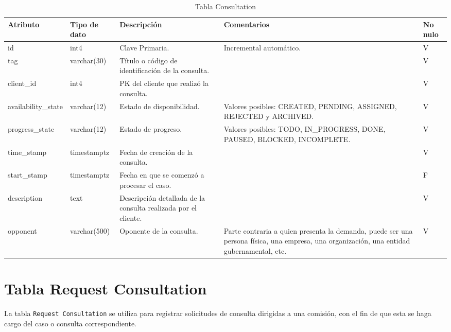 \begin{table}[H]
\centering
\label{tab:consultation}
\begin{tabular}{|p{3cm}|p{2.5cm}|p{4.5cm}|p{4cm}|p{1cm}|}
\hline
\textbf{Atributo} & \textbf{Tipo de dato}  & \textbf{Descripción} & \textbf{Comentarios} & \textbf{No nulo} \\ \hline
id & int4 & Clave Primaria. & Incremental automático. & V \\ \hline
tag & varchar(30) & Título o código de identificación de la consulta. & & V \\ \hline
client\_id & int4 & PK del cliente que realizó la consulta. & & V \\ \hline
availability\_state & varchar(12) & Estado de disponibilidad. & Valores posibles: CREATED, PENDING, ASSIGNED, REJECTED y ARCHIVED. & V \\ \hline
progress\_state & varchar(12)  & Estado de progreso. & Valores posibles: TODO, IN\_PROGRESS, DONE, PAUSED, BLOCKED, INCOMPLETE. & V \\ \hline
time\_stamp & timestamptz & Fecha de creación de la consulta. &  & V \\ \hline
start\_stamp & timestamptz & Fecha en que se comenzó a procesar el caso. &  & F \\ \hline
description & text & Descripción detallada de la consulta realizada por el cliente. &  & V \\ \hline
opponent & varchar(500) & Oponente de la consulta. &  Parte contraria a quien presenta la demanda, puede ser una persona física, una empresa, una organización, una entidad gubernamental, etc. & V \\ \hline

\end{tabular}
\caption{Tabla Consultation}
\end{table}



\section{Tabla Request Consultation}\label{sec:table-req-consultation}
La tabla \texttt{Request Consultation} se utiliza para registrar solicitudes de consulta dirigidas a una comisión, con el fin de que esta se haga cargo del caso o consulta correspondiente.

